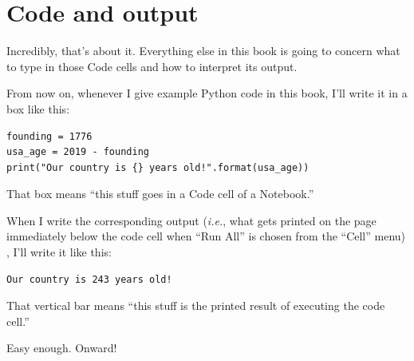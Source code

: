 
\section{Code and output}

Incredibly, that's about it. Everything else in this book is going to concern
what to type in those Code cells and how to interpret its output.

From now on, whenever I give example Python code in this book, I'll write it in
a box like this:

\begin{Verbatim}[fontsize=\small,samepage=true,frame=single,framesep=3mm]
founding = 1776
usa_age = 2019 - founding
print("Our country is {} years old!".format(usa_age))
\end{Verbatim}

That box means ``this stuff goes in a Code cell of a Notebook.''

When I write the corresponding output (\textit{i.e.}, what gets printed on the
page immediately below the code cell when ``Run All'' is chosen from the
``Cell'' menu) , I'll write it like this:

\begin{Verbatim}[fontsize=\small,samepage=true,frame=leftline,framesep=5mm,framerule=1mm]
Our country is 243 years old!
\end{Verbatim}

That vertical bar means ``this stuff is the printed result of executing the
code cell.''

Easy enough. Onward!
